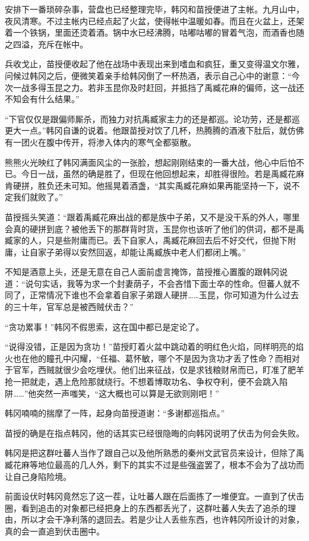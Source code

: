 安排下一番琐碎杂事，营盘也已经整理完毕，韩冈和苗授便进了主帐。九月山中，夜风清寒。不过主帐内已经点起了火盆，使得帐中温暖如春。而且在火盆上，还架着一个铁锅，里面还烫着酒。锅中水已经沸腾，咕嘟咕嘟的冒着气泡，而酒香也随之四溢，充斥在帐中。

兵收戈止，苗授便收起了他在战场中表现出来到嗜血和疯狂，重又变得温文尔雅，问候过韩冈之后，便微笑着亲手给韩冈倒了一杯热酒，表示自己心中的谢意：“今次一战多得玉昆之力。若非玉昆你及时赶回，并抵挡了禹臧花麻的偏师，这一战还不知会有什么结果。”

“下官仅仅是跟偏师厮杀，而独力对抗禹臧家主力的还是都巡。论功劳，还是都巡更大一点。”韩冈自谦的说着。他跟苗授对饮了几杯，热腾腾的酒液下肚后，就仿佛有一团火在腹中传开，将渗入体内的寒气全都驱散。

熊熊火光映红了韩冈满面风尘的一张脸，想起刚刚结束的一番大战，他心中后怕不已。今日一战，虽然的确是胜了，但现在他回想起来，却胜得很险。若是禹臧花麻肯硬拼，胜负还未可知。他摇晃着酒盏，“其实禹臧花麻如果再能坚持一下，说不定我们就败了。”

苗授摇头笑道：“跟着禹臧花麻出战的都是族中子弟，又不是没干系的外人，哪里会真的硬拼到底？被他丢下的那群背时货，玉昆你也该听了他们的供词，都不是禹臧家的人，只是些附庸而已。丢下自家人，禹臧花麻回去后不好交代，但抛下附庸，让自家子弟得以安然回返，却能让禹臧族中老人们都闭上嘴。”

不知是酒意上头，还是无意在自己人面前虚言掩饰，苗授推心置腹的跟韩冈说道：“说句实话，我等为求一个封妻荫子，不会吝惜下面士卒的性命。但蕃人就不同了，正常情况下谁也不会拿着自家子弟跟人硬拼……玉昆，你可知道为什么过去的三十年，官军总是被西贼伏击？”

“贪功累事！”韩冈不假思索，这在国中都已是定论了。

“说得没错，正是因为贪功！”苗授盯着火盆中跳动着的明红色火焰，同样明亮的焰火也在他的瞳孔中闪耀，“任福、葛怀敏，哪个不是因为贪功才丢了性命？而相对于官军，西贼就很少会吃埋伏。他们出来征战，仅是求钱粮财帛而已，盯准了肥羊抢一把就走，遇上危险那就绕行。不想着博取功名、争权夺利，便不会跳入陷阱……”他突然一声嗤笑，“这大概也可以算是无欲则刚吧！”

韩冈喃喃的揣摩了一阵，起身向苗授道谢：“多谢都巡指点。”

苗授的确是在指点韩冈，他的话其实已经很隐晦的向韩冈说明了伏击为何会失败。

韩冈是把这群吐蕃人当作了跟自己以及他所熟悉的秦州文武官员来设计，但除了禹臧花麻等地位最高的几人外，剩下的其实不过是些强盗罢了，根本不会为了战功而让自己身陷险境。

前面设伏时韩冈竟然忘了这一茬，让吐蕃人跟在后面拣了一堆便宜。一直到了伏击圈，看到追击的对象都已经把身上的东西都丢光了，这群吐蕃人失去了追杀的理由，所以才会干净利落的退回去。若是少让人丢些东西，也许韩冈所设计的对象，真的会一直追到伏击圈中。

